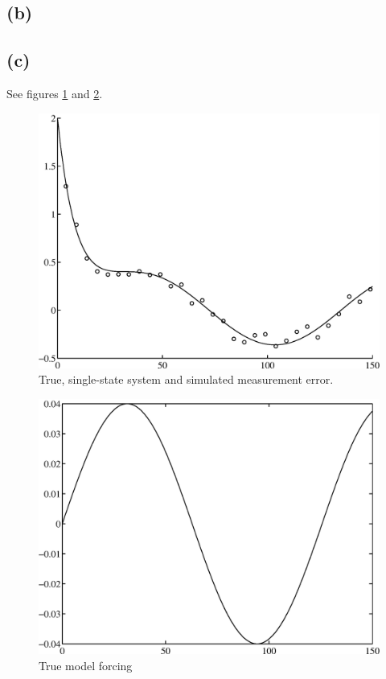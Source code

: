 \documentclass[fleqn, letterpaper]{tufte-handout}
\begin{document}
\subsection{(b)}

\subsection{(c)}
See figures \ref{2ca} and \ref{2cb}.
\begin{figure}
        \includegraphics[width=\textwidth]{2ca}
        \caption{True, single-state system and simulated measurement error.}
        \label{2ca}
\end{figure}
\begin{figure}
        \includegraphics[width=\textwidth]{2cb}
        \caption{True model forcing}
        \label{2cb}
\end{figure}
\end{document}
